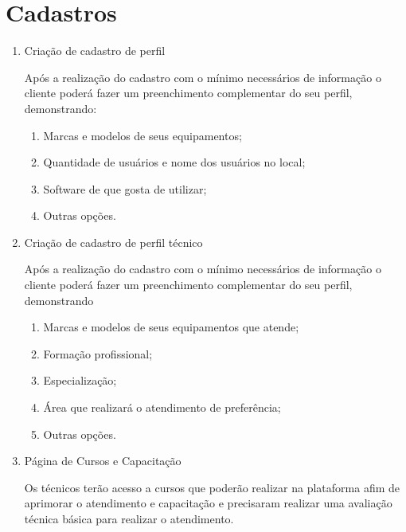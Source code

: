 \documentclass[
    12pt,               %
    openright,          %
    oneside,
    a4paper,            %
    MODELO,             %
    english,            %
    brazil              %
   ]{ifsp-spo-inf-ctds}
\begin{document}
\section{Cadastros}

	\begin{enumerate}
		
		\item 
		Criação de cadastro de perfil
		
		Após a realização do cadastro com o mínimo necessários de informação o cliente poderá fazer um preenchimento complementar do seu perfil, demonstrando:
		
			\begin{enumerate}
				
				\item 
				Marcas e modelos de seus equipamentos;
				
				\item
				Quantidade de usuários e nome dos usuários no local;
				
				\item
				Software de que gosta de utilizar;
				
				\item
				Outras opções.
				
			\end{enumerate}
		
		\item 
		Criação de cadastro de perfil técnico
		
		Após a realização do cadastro com o mínimo necessários de informação o cliente poderá fazer um preenchimento complementar do seu perfil, demonstrando
		
			\begin{enumerate}
				
				\item
				Marcas e modelos de seus equipamentos que atende;
				
				\item
				Formação profissional;
				
				\item
				Especialização;
				
				\item
				Área que realizará o atendimento de preferência;
				
				\item
				Outras opções. 
				
			\end{enumerate}
		
		\item
		Página de Cursos e Capacitação
		
		Os técnicos terão acesso a cursos que poderão realizar na plataforma afim de aprimorar o atendimento e capacitação e precisaram realizar uma avaliação técnica básica para realizar o atendimento.
		
	\end{enumerate}
\end{document}

